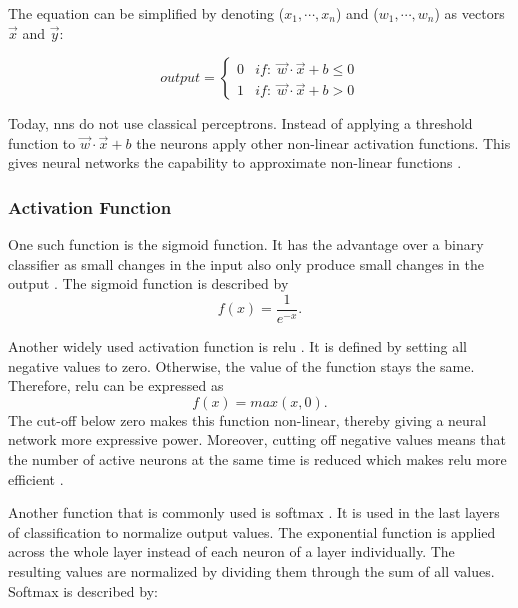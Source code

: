 The equation can be simplified by denoting ($x_1, \cdots, x_n$) and ($w_1, \cdots, w_n$) as vectors $\vec{x}$ and $\vec{y}$:

\begin{equation}
    output = 
    \begin{cases}\label{eq:PerceptronVector}
    0 & if:\; \vec{w} \cdot \vec{x} + b \le 0 \\
    1 & if:\; \vec{w} \cdot \vec{x} + b > 0
    \end{cases}
\end{equation}

Today, \acp{nn} do not use classical perceptrons. Instead of applying a threshold function to $\vec{w} \cdot \vec{x} + b$ the neurons apply other non-linear activation functions. This gives neural networks the capability to approximate non-linear functions \cite{cybenko1989approximation, hornik1991approximation, sharma2020activation}.

\subsubsection{Activation Function}
\label{sec:Foundations:NeuralNetworks:ActivationFunction}

One such function is the sigmoid function.  It has the advantage over a binary classifier as small changes in the input also only produce small changes in the output \cite{nielsen2015neural}. The sigmoid function is described by $$f(x) = \frac{1}{e^{-x}}.$$

Another widely used activation function is \ac{relu} \cite{fukushima1969visual, goodfellow2016deep, nielsen2015neural}. It is defined by setting all negative values to zero. Otherwise, the value of the function stays the same. Therefore, \ac{relu} can be expressed as $$f(x)  = max(x,0).$$ 
The cut-off below zero makes this function non-linear, thereby giving a neural network more expressive power. Moreover, cutting off negative values means that the number of active neurons at the same time is reduced which makes \ac{relu} more efficient \cite{sharma2020activation}.

Another function that is commonly used is softmax \cite{liu2016computer, goodfellow2016deep}. It is used in the last layers of classification to normalize output values. The exponential function is applied across the whole layer instead of each neuron of a layer individually. The resulting values are normalized by dividing them through the sum of all values. Softmax is described by:

